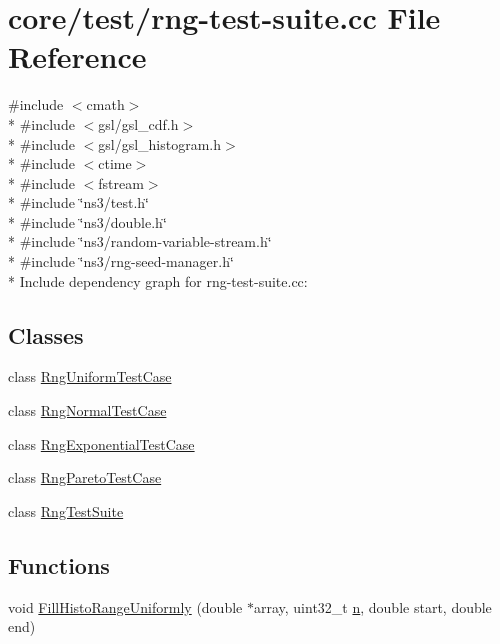 \hypertarget{rng-test-suite_8cc}{}\section{core/test/rng-\/test-\/suite.cc File Reference}
\label{rng-test-suite_8cc}
{\ttfamily \#include $<$cmath$>$}\\*
{\ttfamily \#include $<$gsl/gsl\+\_\+cdf.\+h$>$}\\*
{\ttfamily \#include $<$gsl/gsl\+\_\+histogram.\+h$>$}\\*
{\ttfamily \#include $<$ctime$>$}\\*
{\ttfamily \#include $<$fstream$>$}\\*
{\ttfamily \#include \char`\"{}ns3/test.\+h\char`\"{}}\\*
{\ttfamily \#include \char`\"{}ns3/double.\+h\char`\"{}}\\*
{\ttfamily \#include \char`\"{}ns3/random-\/variable-\/stream.\+h\char`\"{}}\\*
{\ttfamily \#include \char`\"{}ns3/rng-\/seed-\/manager.\+h\char`\"{}}\\*
Include dependency graph for rng-\/test-\/suite.cc\+:
\subsection*{Classes}
\begin{DoxyCompactItemize}
\item 
class \hyperlink{classRngUniformTestCase}{Rng\+Uniform\+Test\+Case}
\item 
class \hyperlink{classRngNormalTestCase}{Rng\+Normal\+Test\+Case}
\item 
class \hyperlink{classRngExponentialTestCase}{Rng\+Exponential\+Test\+Case}
\item 
class \hyperlink{classRngParetoTestCase}{Rng\+Pareto\+Test\+Case}
\item 
class \hyperlink{classRngTestSuite}{Rng\+Test\+Suite}
\end{DoxyCompactItemize}
\subsection*{Functions}
\begin{DoxyCompactItemize}
\item 
void \hyperlink{rng-test-suite_8cc_ac2abe44da5ad81e1927f899392de4ada}{Fill\+Histo\+Range\+Uniformly} (double $\ast$array, uint32\+\_\+t \hyperlink{lte__link__budget__x2__handover__measures_8m_abdb05bc5a064cf642a06c83b3392f148}{n}, double start, double end)
\end{DoxyCompactItemize}
